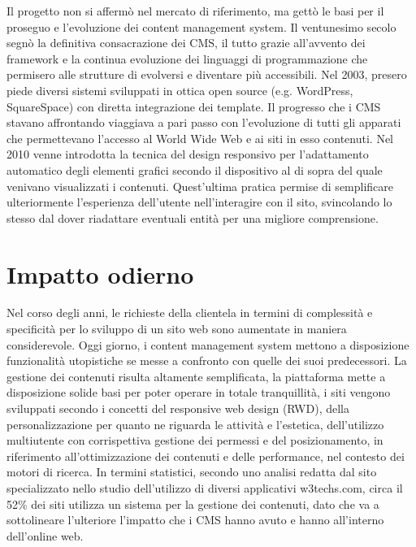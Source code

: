 Il progetto non si affermò nel mercato di riferimento, ma gettò le basi per il proseguo e l'evoluzione dei content management system.
Il ventunesimo secolo segnò la definitiva consacrazione dei CMS, il tutto grazie all'avvento dei framework e la continua evoluzione dei linguaggi di programmazione che permisero alle strutture di evolversi e diventare più accessibili. Nel 2003, presero piede diversi sistemi sviluppati in ottica open source (e.g. WordPress, SquareSpace) con diretta integrazione dei template.
Il progresso che i CMS stavano affrontando viaggiava a pari passo con l'evoluzione di tutti gli apparati che permettevano l'accesso al World Wide Web e ai siti in esso contenuti. Nel 2010 venne introdotta la tecnica del design responsivo per l'adattamento automatico degli elementi grafici secondo il dispositivo al di sopra del quale venivano visualizzati i contenuti. Quest'ultima pratica permise di semplificare ulteriormente l'esperienza dell'utente nell'interagire con il sito, svincolando lo stesso dal dover riadattare eventuali entità per una migliore comprensione.

\section{Impatto odierno}
Nel corso degli anni, le richieste della clientela in termini di complessità e specificità per lo sviluppo di un sito web sono aumentate in maniera considerevole.
Oggi giorno, i content management system mettono a disposizione funzionalità utopistiche se messe a confronto con quelle dei suoi predecessori. La gestione dei contenuti risulta altamente semplificata, la piattaforma mette a disposizione solide basi per poter operare in totale tranquillità, i siti vengono sviluppati secondo i concetti del responsive web design (RWD), della personalizzazione per quanto ne riguarda le attività e l'estetica, dell'utilizzo multiutente con corrispettiva gestione dei permessi e del posizionamento, in riferimento all'ottimizzazione dei contenuti e delle performance, nel contesto dei motori di ricerca. \hfill \break
In termini statistici, secondo uno analisi redatta dal sito specializzato nello studio dell'utilizzo di diversi applicativi w3techs.com, circa il 52\% dei siti  utilizza un sistema per la gestione dei contenuti, dato che va a sottolineare l'ulteriore l'impatto che i CMS hanno avuto e hanno all'interno dell'online web. 
\clearpage
